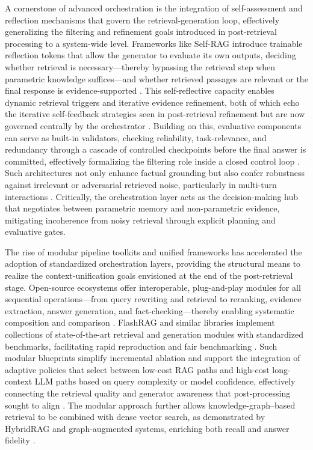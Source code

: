 \documentclass[11pt,a4paper]{article}
\begin{document}
A cornerstone of advanced orchestration is the integration of self-assessment and reflection mechanisms that govern the retrieval-generation loop, effectively generalizing the filtering and refinement goals introduced in post-retrieval processing to a system-wide level. Frameworks like Self-RAG introduce trainable reflection tokens that allow the generator to evaluate its own outputs, deciding whether retrieval is necessary---thereby bypassing the retrieval step when parametric knowledge suffices---and whether retrieved passages are relevant or the final response is evidence-supported \cite{arxiv:2402.17532v3,arxiv:2404.17347v1}. This self-reflective capacity enables dynamic retrieval triggers and iterative evidence refinement, both of which echo the iterative self-feedback strategies seen in post-retrieval refinement but are now governed centrally by the orchestrator \cite{arxiv:2404.17347v1}. Building on this, evaluative components can serve as built-in validators, checking reliability, task-relevance, and redundancy through a cascade of controlled checkpoints before the final answer is committed, effectively formalizing the filtering role inside a closed control loop \cite{arxiv:2403.15246v1}. Such architectures not only enhance factual grounding but also confer robustness against irrelevant or adversarial retrieved noise, particularly in multi-turn interactions \cite{arxiv:2406.05870v2,arxiv:2402.17532v3}. Critically, the orchestration layer acts as the decision-making hub that negotiates between parametric memory and non-parametric evidence, mitigating incoherence from noisy retrieval through explicit planning and evaluative gates.

The rise of modular pipeline toolkits and unified frameworks has accelerated the adoption of standardized orchestration layers, providing the structural means to realize the context-unification goals envisioned at the end of the post-retrieval stage. Open-source ecosystems offer interoperable, plug-and-play modules for all sequential operations---from query rewriting and retrieval to reranking, evidence extraction, answer generation, and fact-checking---thereby enabling systematic composition and comparison \cite{arxiv:2402.07483v1}. FlashRAG and similar libraries implement collections of state-of-the-art retrieval and generation modules with standardized benchmarks, facilitating rapid reproduction and fair benchmarking \cite{arxiv:2402.07483v1}. Such modular blueprints simplify incremental ablation and support the integration of adaptive policies that select between low-cost RAG paths and high-cost long-context LLM paths based on query complexity or model confidence, effectively connecting the retrieval quality and generator awareness that post-processing sought to align \cite{arxiv:2404.14043v1,arxiv:2402.01694v1}. The modular approach further allows knowledge-graph--based retrieval to be combined with dense vector search, as demonstrated by HybridRAG and graph-augmented systems, enriching both recall and answer fidelity \cite{arxiv:2402.13547v1,arxiv:2402.13547v1}.
\end{document}
